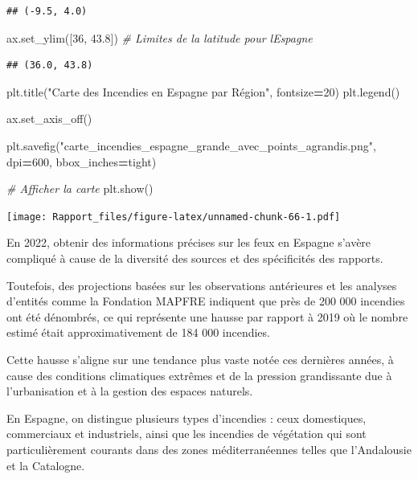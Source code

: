 \documentclass[
]{article}
\newenvironment{Shaded}{\begin{snugshade}}{\end{snugshade}}
\newcommand{\CommentTok}[1]{\textcolor[rgb]{0.56,0.35,0.01}{\textit{#1}}}
\newcommand{\DecValTok}[1]{\textcolor[rgb]{0.00,0.00,0.81}{#1}}
\newcommand{\FloatTok}[1]{\textcolor[rgb]{0.00,0.00,0.81}{#1}}
\newcommand{\NormalTok}[1]{#1}
\newcommand{\OperatorTok}[1]{\textcolor[rgb]{0.81,0.36,0.00}{\textbf{#1}}}
\newcommand{\StringTok}[1]{\textcolor[rgb]{0.31,0.60,0.02}{#1}}
\begin{document}
\begin{verbatim}
## (-9.5, 4.0)
\end{verbatim}

\begin{Shaded}
\begin{Highlighting}[]
\NormalTok{ax.set\_ylim([}\DecValTok{36}\NormalTok{, }\FloatTok{43.8}\NormalTok{])    }\CommentTok{\# Limites de la latitude pour l\textquotesingle{}Espagne}
\end{Highlighting}
\end{Shaded}

\begin{verbatim}
## (36.0, 43.8)
\end{verbatim}

\begin{Shaded}
\begin{Highlighting}[]
\NormalTok{plt.title(}\StringTok{"Carte des Incendies en Espagne par Région"}\NormalTok{, fontsize}\OperatorTok{=}\DecValTok{20}\NormalTok{)}
\NormalTok{plt.legend()}

\NormalTok{ax.set\_axis\_off()}

\NormalTok{plt.savefig(}\StringTok{"carte\_incendies\_espagne\_grande\_avec\_points\_agrandis.png"}\NormalTok{, dpi}\OperatorTok{=}\DecValTok{600}\NormalTok{, bbox\_inches}\OperatorTok{=}\StringTok{\textquotesingle{}tight\textquotesingle{}}\NormalTok{)}

\CommentTok{\# Afficher la carte}
\NormalTok{plt.show()}
\end{Highlighting}
\end{Shaded}

\texttt{[image: Rapport\_files/figure-latex/unnamed-chunk-66-1.pdf]}

En 2022, obtenir des informations précises sur les feux en Espagne
s'avère compliqué à cause de la diversité des sources et des
spécificités des rapports.

Toutefois, des projections basées sur les observations antérieures et
les analyses d'entités comme la Fondation MAPFRE indiquent que près de
200 000 incendies ont été dénombrés, ce qui représente une hausse par
rapport à 2019 où le nombre estimé était approximativement de 184 000
incendies.

Cette hausse s'aligne sur une tendance plus vaste notée ces dernières
années, à cause des conditions climatiques extrêmes et de la pression
grandissante due à l'urbanisation et à la gestion des espaces naturels.

En Espagne, on distingue plusieurs types d'incendies : ceux domestiques,
commerciaux et industriels, ainsi que les incendies de végétation qui
sont particulièrement courants dans des zones méditerranéennes telles
que l'Andalousie et la Catalogne.
\end{document}
